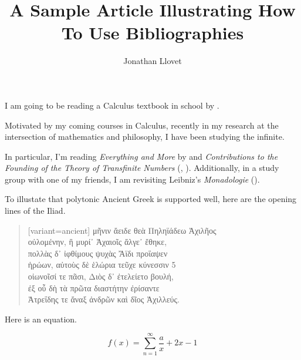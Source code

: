 \documentclass{article}
\title{A Sample Article Illustrating How To Use Bibliographies}
\author{Jonathan Llovet}
\date{}
\begin{document}
\maketitle

I am going to be reading a Calculus textbook in school by \textcite{briggsCalculusEarlyTranscendentals2019}.

Motivated by my coming courses in Calculus,
recently in my research at the intersection of mathematics and philosophy,
I have been studying the infinite.

In particular, I'm reading \textit{Everything and More} by \textcite{wallaceEverythingMoreCompact2010}
and \textit{Contributions to the Founding of the Theory of Transfinite Numbers}
(\textcite{cantorContributionsFoundingTheory1955}, \textcite{cantorGesammelteAbhandlungenMathematischen2013}).
Additionally, in a study group with one of my friends,
I am revisiting Leibniz's \textit{Monadologie} (\textcite{leibnizMonadologieFranzosischDeutsch2017}).

To illustate that polytonic Ancient Greek is supported well, here are the opening lines of the Iliad. \textcite{homereHomeriOpera1920}

\begin{quote}
    \begin{greek}[variant=ancient]
        μῆνιν ἄειδε θεὰ Πηληϊάδεω Ἀχιλῆος\\
        οὐλομένην, ἣ μυρί᾽ Ἀχαιοῖς ἄλγε᾽ ἔθηκε,\\
        πολλὰς δ᾽ ἰφθίμους ψυχὰς Ἄϊδι προΐαψεν\\
        ἡρώων, αὐτοὺς δὲ ἑλώρια τεῦχε κύνεσσιν \hfill 5\\
        οἰωνοῖσί τε πᾶσι, Διὸς δ᾽ ἐτελείετο βουλή,\\
        ἐξ οὗ δὴ τὰ πρῶτα διαστήτην ἐρίσαντε\\
        Ἀτρεΐδης τε ἄναξ ἀνδρῶν καὶ δῖος Ἀχιλλεύς.\\
    \end{greek}
\end{quote}

Here is an equation.

\begin{equation}
    f(x) = \sum_{n = 1}^{\infty} \frac{a}{x} + 2x - 1
\end{equation}

\printbibliography
\end{document}
